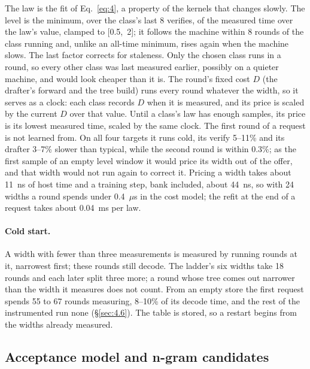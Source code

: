 \documentclass[10pt,twocolumn,letterpaper]{article}
\begin{document}
The law is the fit of Eq.~\eqref{eq:4}, a property of the kernels that changes slowly. The level is the minimum, over the class's last 8 verifies, of the measured time over the law's value, clamped to [0.5,~2]; it follows the machine within 8 rounds of the class running and, unlike an all-time minimum, rises again when the machine slows. The last factor corrects for staleness. Only the chosen class runs in a round, so every other class was last measured earlier, possibly on a quieter machine, and would look cheaper than it is. The round's fixed cost $D$ (the drafter's forward and the tree build) runs every round whatever the width, so it serves as a clock: each class records $D$ when it is measured, and its price is scaled by the current $D$ over that value. Until a class's law has enough samples, its price is its lowest measured time, scaled by the same clock. The first round of a request is not learned from. On all four targets it runs cold, its verify 5--11\% and its drafter 3--7\% slower than typical, while the second round is within 0.3\%; as the first sample of an empty level window it would price its width out of the offer, and that width would not run again to correct it. Pricing a width takes about 11~ns of host time and a training step, bank included, about 44~ns, so with 24 widths a round spends under 0.4~$\mu$s in the cost model; the refit at the end of a request takes about 0.04~ms per law.

\paragraph{Cold start.} A width with fewer than three measurements is measured by running rounds at it, narrowest first; these rounds still decode. The ladder's six widths take 18 rounds and each later split three more; a round whose tree comes out narrower than the width it measures does not count. From an empty store the first request spends 55 to 67 rounds measuring, 8--10\% of its decode time, and the rest of the instrumented run none (\S\ref{sec:4.6}). The table is stored, so a restart begins from the widths already measured.

\subsection{Acceptance model and n-gram candidates}\label{sec:3.3}
\end{document}
